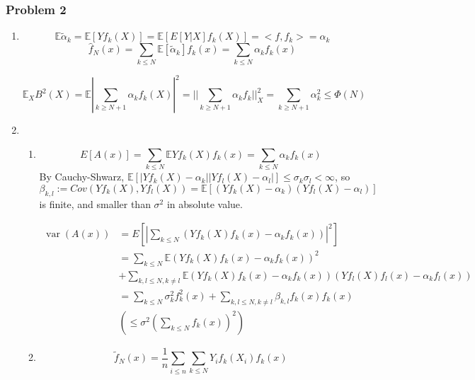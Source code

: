 \documentclass[12pt]{article}
\DeclareMathOperator{\var}{var}
\newcommand{\Q}[1]{\subsubsection*{Problem #1}}
\begin{document}
\Q{2}
\begin{enumerate}
\item
  $$\mathbb E \tilde \alpha_k = \mathbb E[Y f_k(X)] = \mathbb E[ E[Y |
  X] f_k(X)] = <f, f_k> = \alpha_k$$
  $$\hat f_N(x) = \sum_{k \le N} \mathbb E [\tilde \alpha_k]  f_k(x) = \sum_{k \le N} \alpha_k f_k(x)$$
  
  $$\mathbb E_X B^2(X) = \mathbb E |\sum_{k \ge N+1} \alpha_k f_k(X)|^2 =  ||\sum_{k \ge N+1} \alpha_k f_k||_X^2 = \sum_{k \ge N+1} \alpha_k^2 \le \Phi(N)$$
  
\item 
  \begin{enumerate}
  \item
    $$E[A(x)] = \sum_{k \le N} \mathbb E Yf_k(X) f_k(x) = \sum_{k\le N} \alpha_k f_k(x)$$
    By Cauchy-Shwarz, $\mathbb E[ |Yf_k(X) - \alpha_k| |Yf_l(X) - \alpha_l| ] \le \sigma_k \sigma_l < \infty$,
    so $\beta_{k,l} := Cov(Y f_k(X), Yf_l(X)) = \mathbb E[ (Yf_k(X) - \alpha_k) (Yf_l(X) - \alpha_l) ]$ is finite, and smaller than $\sigma^2$ in absolute value.

    \begin{align*}
      \var(A(x))
      &= E[ |\sum_{k \le N}  (Y f_k(X) f_k(x) - \alpha_k f_k(x))|^2]
      \\ &= \sum_{k \le N} \mathbb E (Y f_k(X) f_k(x) - \alpha_k f_k(x))^2
      \\&+ \sum_{k, l \le N, k \ne l} \mathbb E (Y f_k(X) f_k(x) - \alpha_k f_k(x))(Y f_l(X) f_l(x) - \alpha_k f_l(x))
      \\ &= \sum_{k \le N} \sigma_k^2 f_k^2(x)  + \sum_{k, l \le N, k \ne l} \beta_{k,l} f_k(x)f_k(x)
      \\ & \left(\le \sigma^2 (\sum_{k \le N} f_k(x))^2 \right)
    \end{align*}
  \item
    $$\tilde f_N(x) = \frac1 n \sum_{i \le n} \sum_{k \le N} Y_if_k(X_i)f_k(x)$$
    

\end{enumerate}
\end{enumerate}
\end{document}
